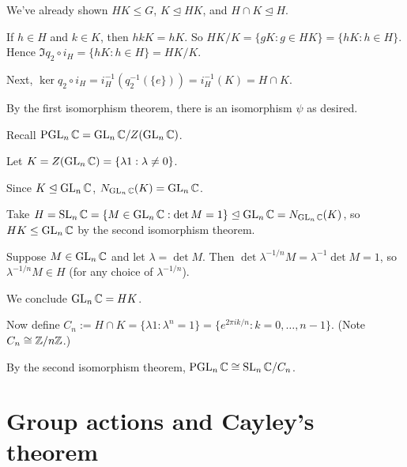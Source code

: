 \documentclass[12pt,letterpaper]{report}
\begin{document}
\begin{center}
\end{center}

\begin{thmproof}
  We've already shown $HK \leq G$, $K \trianglelefteq HK$, and $H \cap K \trianglelefteq H$.

  If $h \in H$ and $k \in K$, then $hkK = hK$.
  So $HK/K = \{gK : g \in HK\} = \{hK : h \in H\}$.
  Hence $\Im q_2 \circ i_H = \{hK : h \in H\} = HK/K$.

  Next, $\ker q_2 \circ i_H = i_H^{-1}(q_2^{-1}(\{e\})) = i_H^{-1}(K) = H \cap K$.

  By the first isomorphism theorem, there is an isomorphism $\psi$ as desired.
\end{thmproof}

\begin{ex}
  Recall $\operatorname{PGL}_n\mathbb{C} = \operatorname{GL}_n\mathbb{C} / Z(\operatorname{GL}_n\mathbb{C})$.

  Let $K = Z(\operatorname{GL}_n\mathbb{C}) = \{\lambda 1 : \lambda \neq 0\}$.

  Since $K \trianglelefteq \operatorname{GL}_n\mathbb{C}$, $N_{\operatorname{GL}_n\mathbb{C}}(K) = \operatorname{GL}_n\mathbb{C}$.

  Take $H = \operatorname{SL}_n\mathbb{C} = \{M \in \operatorname{GL}_n\mathbb{C} : \det M = 1\}
    \trianglelefteq \operatorname{GL}_n\mathbb{C} = N_{\operatorname{GL}_n\mathbb{C}}(K)$, so $HK \leq \operatorname{GL}_n\mathbb{C}$ by the
  second isomorphism theorem.

  Suppose $M \in \operatorname{GL}_n\mathbb{C}$ and let $\lambda = \det M$.
  Then $\det \lambda^{-1/n}M = \lambda^{-1} \det M = 1$, so $\lambda^{-1/n}M \in H$ (for any
  choice of $\lambda^{-1/n}$).

  We conclude $\operatorname{GL}_n\mathbb{C} = HK$.

  Now define $C_n := H \cap K = \{\lambda 1 : \lambda^n = 1\}
    = \{e^{2\pi i k/n} : k = 0, \ldots, n - 1\}$.
  (Note $C_n \cong \mathbb{Z}/{n}\mathbb{Z}$.)

  By the second isomorphism theorem, $\operatorname{PGL}_n\mathbb{C} \cong \operatorname{SL}_n\mathbb{C}/C_n$.
\end{ex}


\section{Group actions and Cayley's theorem}
\end{document}
